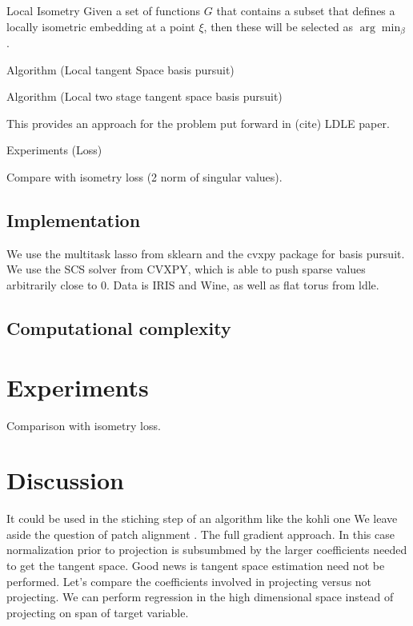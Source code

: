 \documentclass[a4paper,11pt]{article}
\begin{document}
\begin{proposition}{Local Isometry}
Given a set of functions $G$ that contains a subset that defines a locally isometric embedding at a point $\xi$, then these will be selected as $\arg \min_\beta$.
\end{proposition}

Algorithm (Local tangent Space basis pursuit)

Algorithm (Local two stage tangent space basis pursuit)

This provides an approach for the problem put forward in (cite) LDLE paper.

Experiments (Loss)

Compare with isometry loss (2 norm of singular values).

\subsection{Implementation}

We use the multitask lasso from sklearn and the cvxpy package for basis pursuit.  We use the SCS solver from CVXPY, which is able to push sparse values arbitrarily close to 0. Data is IRIS and Wine, as well as flat torus from ldle.
\subsection{Computational complexity}
\section{Experiments}

Comparison with isometry loss.


\section{Discussion}

It could be used in the stiching step of an algorithm like the kohli one
We leave aside the question of patch alignment \cite{https://arxiv.org/pdf/2303.11620.pdf, LDLE paper}.
The full gradient approach.
In this case normalization prior to projection is subsumbmed by the larger coefficients needed to get the tangent space.
Good news is tangent space estimation need not be performed.
Let's compare the coefficients involved in projecting versus not projecting.
We can perform regression in the high dimensional space instead of projecting on span of target variable.
\end{document}

